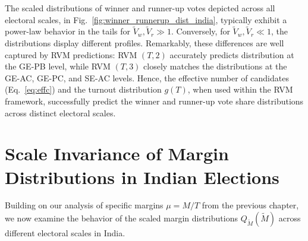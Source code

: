 The scaled distributions of winner and runner-up votes depicted across all electoral scales, in Fig.~\ref{fig:winner_runnerup_dist_india}, typically exhibit a power-law behavior in the tails for $\widetilde{V}_w, \widetilde{V}_r \gg 1$. Conversely, for $\widetilde{V}_w, \widetilde{V}_r \ll 1$, the distributions display different profiles. Remarkably, these differences are well captured by RVM predictions: RVM $(T, 2)$ accurately predicts distribution at the GE-PB level, while RVM $(T, 3)$ closely matches the distributions at the GE-AC, GE-PC, and SE-AC levels. Hence, the effective number of candidates (Eq.~\ref{eq:effc}) and the turnout distribution $g(T)$, when used within the RVM framework, successfully predict the winner and runner-up vote share distributions across distinct electoral scales.   

\section{Scale Invariance of Margin Distributions in Indian Elections}
Building on our analysis of specific margins $\mu = M/T$ from the previous chapter, we now examine the behavior of the scaled margin distributions $Q_{\widetilde{M}}(\widetilde{M})$ across different electoral scales in India.
